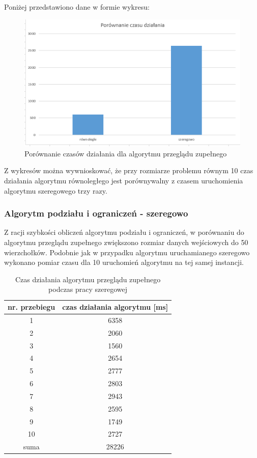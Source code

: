 \documentclass{article}
\begin{document}
			Poniżej przedstawiono dane w formie wykresu:
				\begin{figure}[H]
					\centering
					\includegraphics[width=0.9\linewidth]{bfRvsS}
					\caption{Porównanie czasów działania dla algorytmu przeglądu zupełnego}
				\end{figure}
				
			Z wykresów można wywnioskować, że przy rozmiarze problemu równym 10 czas działania algorytmu równoległego jest porównywalny z czasem uruchomienia algorytmu szeregowego trzy razy.
			
		\subsubsection{Algorytm podziału i ograniczeń - szeregowo}
			Z racji szybkości obliczeń algorytmu podziału i ograniczeń, w porównaniu do algorytmu przeglądu zupełnego zwiększono rozmiar danych wejściowych do 50 wierzchołków. Podobnie jak w przypadku algorytmu uruchamianego szeregowo wykonano pomiar czasu dla 10 uruchomień algorytmu na tej samej instancji.
			\begin{table}[H]
				\centering
				\caption{Czas działania algorytmu przeglądu zupełnego podczas pracy szeregowej}
				\begin{tabular}{|c|c|}
					
					\hline nr. przebiegu  & czas działania algorytmu [ms] \\ 
					\hline  1 & 6358 \\ 
					\hline  2 & 2060 \\ 
					\hline  3 & 1560 \\ 
					\hline  4 & 2654 \\ 
					\hline  5 & 2777 \\ 
					\hline  6 & 2803 \\ 
					\hline  7 & 2943 \\ 
					\hline  8 & 2595 \\ 
					\hline  9 & 1749 \\ 
					\hline  10 & 2727 \\ 
					\hline  suma & 28226 \\ 
					\hline 
				\end{tabular} 
			\end{table}
	
\end{document}
